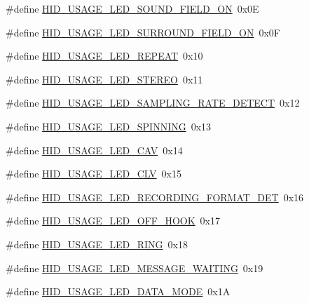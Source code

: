 \begin{DoxyCompactItemize}
\item 
\#define \hyperlink{group__USBD__HID_gaeef30310a72f3d8f1d28072fd7a19f54}{H\+I\+D\+\_\+\+U\+S\+A\+G\+E\+\_\+\+L\+E\+D\+\_\+\+S\+O\+U\+N\+D\+\_\+\+F\+I\+E\+L\+D\+\_\+\+ON}~0x0E
\item 
\#define \hyperlink{group__USBD__HID_ga61e0c8c0c1b6ff63d989949e2531d412}{H\+I\+D\+\_\+\+U\+S\+A\+G\+E\+\_\+\+L\+E\+D\+\_\+\+S\+U\+R\+R\+O\+U\+N\+D\+\_\+\+F\+I\+E\+L\+D\+\_\+\+ON}~0x0F
\item 
\#define \hyperlink{group__USBD__HID_ga5a27afb3743c02f2ede9359644ab9865}{H\+I\+D\+\_\+\+U\+S\+A\+G\+E\+\_\+\+L\+E\+D\+\_\+\+R\+E\+P\+E\+AT}~0x10
\item 
\#define \hyperlink{group__USBD__HID_ga3e8bdb62fd252fa8d4493e0a4bcd1452}{H\+I\+D\+\_\+\+U\+S\+A\+G\+E\+\_\+\+L\+E\+D\+\_\+\+S\+T\+E\+R\+EO}~0x11
\item 
\#define \hyperlink{group__USBD__HID_ga2750d16d17aadf3cb97f3adf876dbab5}{H\+I\+D\+\_\+\+U\+S\+A\+G\+E\+\_\+\+L\+E\+D\+\_\+\+S\+A\+M\+P\+L\+I\+N\+G\+\_\+\+R\+A\+T\+E\+\_\+\+D\+E\+T\+E\+CT}~0x12
\item 
\#define \hyperlink{group__USBD__HID_ga1bf00631eeefe9751ac97aa87318df9a}{H\+I\+D\+\_\+\+U\+S\+A\+G\+E\+\_\+\+L\+E\+D\+\_\+\+S\+P\+I\+N\+N\+I\+NG}~0x13
\item 
\#define \hyperlink{group__USBD__HID_gaf5179627220cbb877f14982f00d36c61}{H\+I\+D\+\_\+\+U\+S\+A\+G\+E\+\_\+\+L\+E\+D\+\_\+\+C\+AV}~0x14
\item 
\#define \hyperlink{group__USBD__HID_gac8a9a7f08802f62c76663f2e4d42ce20}{H\+I\+D\+\_\+\+U\+S\+A\+G\+E\+\_\+\+L\+E\+D\+\_\+\+C\+LV}~0x15
\item 
\#define \hyperlink{group__USBD__HID_gabceb203a1ddf8ce343ea401ebe30ea89}{H\+I\+D\+\_\+\+U\+S\+A\+G\+E\+\_\+\+L\+E\+D\+\_\+\+R\+E\+C\+O\+R\+D\+I\+N\+G\+\_\+\+F\+O\+R\+M\+A\+T\+\_\+\+D\+ET}~0x16
\item 
\#define \hyperlink{group__USBD__HID_gadffeac25955768384e14af34a418af39}{H\+I\+D\+\_\+\+U\+S\+A\+G\+E\+\_\+\+L\+E\+D\+\_\+\+O\+F\+F\+\_\+\+H\+O\+OK}~0x17
\item 
\#define \hyperlink{group__USBD__HID_ga7814936fe33a3630d7c2d61be32bc44b}{H\+I\+D\+\_\+\+U\+S\+A\+G\+E\+\_\+\+L\+E\+D\+\_\+\+R\+I\+NG}~0x18
\item 
\#define \hyperlink{group__USBD__HID_ga2c8171fd81b8878924ebf9c510a8e3fe}{H\+I\+D\+\_\+\+U\+S\+A\+G\+E\+\_\+\+L\+E\+D\+\_\+\+M\+E\+S\+S\+A\+G\+E\+\_\+\+W\+A\+I\+T\+I\+NG}~0x19
\item 
\#define \hyperlink{group__USBD__HID_ga9fb720115913b930bb78194a33179dca}{H\+I\+D\+\_\+\+U\+S\+A\+G\+E\+\_\+\+L\+E\+D\+\_\+\+D\+A\+T\+A\+\_\+\+M\+O\+DE}~0x1A

\end{DoxyCompactItemize}
